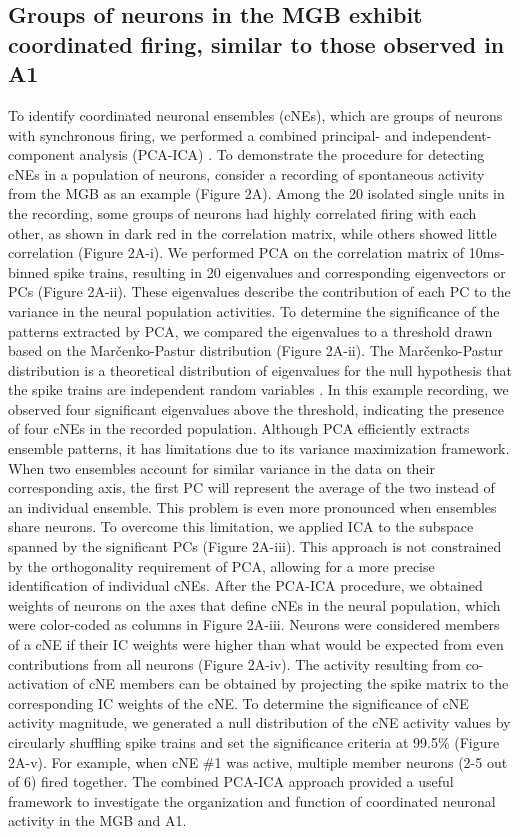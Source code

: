 \documentclass[11pt]{article}
\begin{document}
\subsection*{Groups of neurons in the MGB exhibit coordinated firing, similar to those observed in A1}
To identify coordinated neuronal ensembles (cNEs), which are groups of neurons with synchronous firing, we performed a combined principal- and independent-component analysis (PCA-ICA) \citep{Lopes-dos-Santos2013}. To demonstrate the procedure for detecting cNEs in a population of neurons, consider a recording of spontaneous activity from the MGB as an example (Figure 2A). Among the 20 isolated single units in the recording, some groups of neurons had highly correlated firing with each other, as shown in dark red in the correlation matrix, while others showed little correlation (Figure 2A-i). We performed PCA on the correlation matrix of 10ms-binned spike trains, resulting in 20 eigenvalues and corresponding eigenvectors or PCs (Figure 2A-ii). These eigenvalues describe the contribution of each PC to the variance in the neural population activities. To determine the significance of the patterns extracted by PCA, we compared the eigenvalues to a threshold drawn based on the Marčenko-Pastur distribution (Figure 2A-ii). The Marčenko-Pastur distribution is a theoretical distribution of eigenvalues for the null hypothesis that the spike trains are independent random variables \citep{Peyrache2010, Lopes-dos-Santos2011, Oberto2021}. In this example recording, we observed four significant eigenvalues above the threshold, indicating the presence of four cNEs in the recorded population. Although PCA efficiently extracts ensemble patterns, it has limitations due to its variance maximization framework. When two ensembles account for similar variance in the data on their corresponding axis, the first PC will represent the average of the two instead of an individual ensemble. This problem is even more pronounced when ensembles share neurons. To overcome this limitation, we applied ICA to the subspace spanned by the significant PCs (Figure 2A-iii). This approach is not constrained by the orthogonality requirement of PCA, allowing for a more precise identification of individual cNEs. After the PCA-ICA procedure, we obtained weights of neurons on the axes that define cNEs in the neural population, which were color-coded as columns in Figure 2A-iii. Neurons were considered members of a cNE if their IC weights were higher than what would be expected from even contributions from all neurons (Figure 2A-iv). The activity resulting from co-activation of cNE members can be obtained by projecting the spike matrix to the corresponding IC weights of the cNE. To determine the significance of cNE activity magnitude, we generated a null distribution of the cNE activity values by circularly shuffling spike trains and set the significance criteria at 99.5\% (Figure 2A-v). For example, when cNE \#1 was active, multiple member neurons (2-5 out of 6) fired together. The combined PCA-ICA approach provided a useful framework to investigate the organization and function of coordinated neuronal activity in the MGB and A1.
\end{document}
